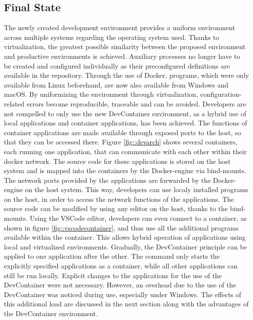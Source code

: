         \subsection{Final State}\label{sec::final}
        
        The newly created development environment provides a uniform environment across multiple systems regarding the operating system used. Thanks to virtualization, the greatest possible similarity between the proposed environment and productive environments is achieved. Auxiliary processes no longer have to be created and configured individually as their preconfigured definitions are available in the repository. Through the use of Docker, programs, which were only available from Linux beforehand, are now also available from Windows and macOS. By uniformizing the environment through virtualization, configuration-related errors become reproducible, traceable and can be avoided.\newline
        Developers are not compelled to only use the new DevContainer environment, as a hybrid use of local applications and container applications, has been achieved. The functions of container applications are made available through exposed ports to the host, so that they can be accessed there. Figure \ref{fig::devarch} shows several containers, each running one application, that can communicate with each other within their docker network. The source code for these applications is stored on the host system and is mapped into the containers by the Docker-engine via bind-mounts. The network ports provided by the applications are forwarded by the Docker-engine on the host system. This way, developers can use localy installed programs on the host, in order to access the network functions of the applications. The source code can be modified by using any editor on the host, thanks to the bind-mounts. Using the \ac{VSCode} editor, developers can even connect to a container, as shown in figure \ref{fig::vscodecontainer}, and thus use all the additional programs available within the container.\newline
        This allows hybrid operation of applications using local and virtualized environments. Gradually, the DevContainer principle can be applied to one application after the other. The command  only starts the explicitly specified applications as a container, while all other applications can still be run locally. Explicit changes to the applications for the use of the DevContainer were not necessary.\newline
        However, an overhead due to the use of the DevContainer was noticed during use, especially under Windows. The effects of this additional load are discussed in the next section along with the advantages of the DevContainer environment.

